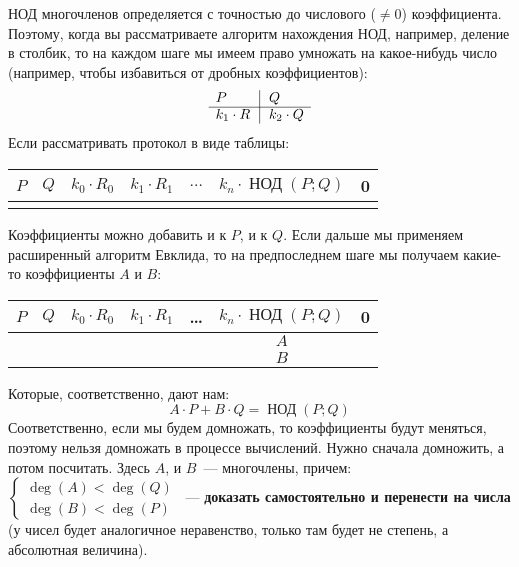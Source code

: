 \documentclass[russian]{lecture-notes}
\theoremstyle{definition}
\DeclareMathOperator{\Deg}{deg}
\newcommand{\D}[1]{\Deg(#1)}
\newcommand{\N}[2]{\mathop{\mbox{НОД}}(#1;#2)}
\begin{document}
    \begin{remark}
        НОД многочленов определяется с точностью до числового ($\ne 0$) коэффициента. Поэтому, когда вы рассматриваете алгоритм нахождения НОД, например, деление в столбик, то на каждом шаге мы имеем право умножать на какое-нибудь число (например, чтобы избавиться от дробных коэффициентов):
        \[
            \begin{array}{l@{\,}r|l}
                P & & \, Q \\
                \cline{1-3}
                k_1 \cdot R & & \, k_2 \cdot Q
            \end{array}
        \]
        Если рассматривать протокол в виде таблицы:
        \begin{table}[H]
            \centering
            \begin{tabular}{c|c|c|c|c|c|c}
                $P$ & $Q$ & $k_0 \cdot R_0$ & $k_1 \cdot R_1$ & $\ldots$ & $k_n \cdot \N{P}{Q}$ & 0 \\
                \hline
                & & & & & &
            \end{tabular}
        \end{table}
        \noindent Коэффициенты можно добавить и к $P$, и к $Q$. Если дальше мы применяем расширенный алгоритм Евклида, то на предпоследнем шаге мы получаем какие-то коэффициенты $A$ и $B$:
        \begin{table}[H]
            \centering
            \begin{tabular}{c|c|c|c|c|c|c}
                $P$ & $Q$ & $k_0 \cdot R_0$ & $k_1 \cdot R_1$ & \ldots & $k_n \cdot \N{P}{Q}$ & 0 \\ \hline
                & & & & & $A$ & \\ \hline
                & & & & & $B$ &
            \end{tabular}
        \end{table}
        \noindent Которые, соответственно, дают нам:
        \[
            A \cdot P + B \cdot Q = \N{P}{Q}
        \]
        Соответственно, если мы будем домножать, то коэффициенты будут меняться, поэтому нельзя домножать в процессе вычислений. Нужно сначала домножить, а потом посчитать. Здесь $A$, и $B$~--- многочлены, причем: \\
        $\begin{cases}
             \D{A} < \D{Q} \\
             \D{B} < \D{P}
        \end{cases}$~--- \textbf{доказать самостоятельно и перенести на числа} (у чисел будет аналогичное неравенство, только там будет не степень, а абсолютная величина).
    \end{remark}
\end{document}
